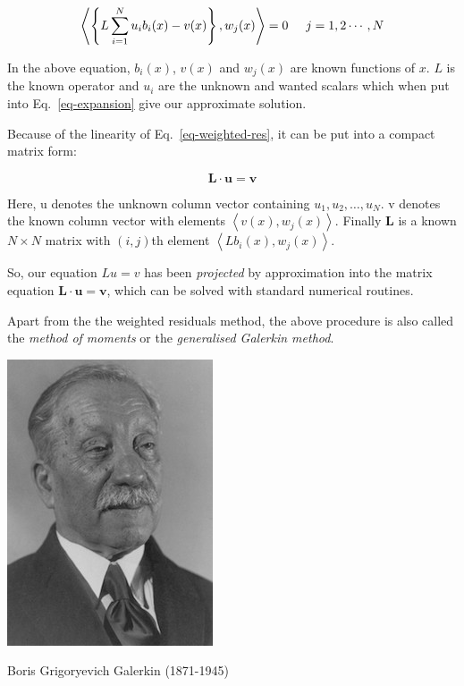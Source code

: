 \begin{equation}
\left\langle \left\{ L \sum_{i=1}^N u_i b_i(x) - v(x)  \right\}, w_j(x) \right\rangle = 0 \hspace{0.5cm} j=1,2\cdots,N \label{eq-weighted-res}
\end{equation}

In the above equation, $b_i(x)$, $v(x)$ and $w_j(x)$ are known functions of $x$. $L$ is the known operator and $u_i$ are the unknown and wanted scalars which when put into Eq.~\ref{eq-expansion} give our approximate solution.

Because of the linearity of Eq.~\ref{eq-weighted-res}, it can be put into a compact matrix form:

\begin{equation}
{\mathbf L} \cdot {\mathbf u} = {\mathbf v}
\end{equation} 

Here, {\mathbf u} denotes the unknown column vector containing $u_1, u_2, \hdots, u_N$. {\mathbf v} denotes the known column vector with elements $\left\langle v(x), w_j(x) \right\rangle$. Finally ${\mathbf L}$ is a known $N \times N$ matrix with $(i,j)$th element $\left\langle L b_i(x), w_j(x) \right\rangle$.

So, our equation $Lu=v$ has been \emph{projected} by approximation into the matrix equation ${\mathbf L} \cdot {\mathbf u} = {\mathbf v}$, which can be solved with standard numerical routines.

Apart from the the weighted residuals method, the above procedure is also called the \emph{method of moments} or the \emph{generalised Galerkin method}.

\begin{marginfigure}[-.0cm]
  \includegraphics{numeric/figures/b_galerkin}
  \caption{Boris Grigoryevich Galerkin (1871-1945)}
\end{marginfigure}


